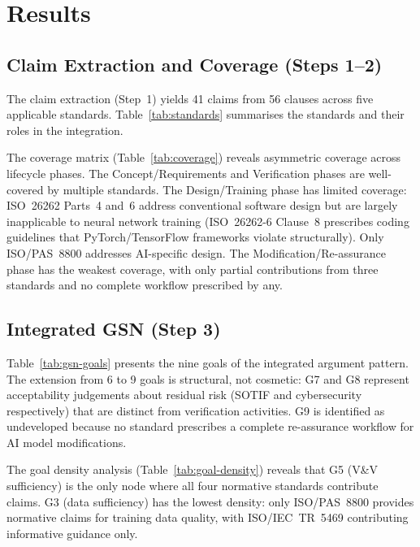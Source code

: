 
\section{Results}\label{sec:results}

\subsection{Claim Extraction and Coverage (Steps 1--2)}

The claim extraction (Step~1) yields 41 claims from 56 clauses across
five applicable standards. Table~\ref{tab:standards} summarises the
standards and their roles in the integration.

The coverage matrix (Table~\ref{tab:coverage}) reveals asymmetric
coverage across lifecycle phases. The Concept/Requirements and
Verification phases are well-covered by multiple standards.
The Design/Training phase has limited coverage: ISO~26262 Parts~4 and~6
address conventional software design but are largely inapplicable to
neural network training (ISO~26262-6 Clause~8 prescribes coding guidelines
that PyTorch/TensorFlow frameworks violate structurally). Only ISO/PAS~8800
addresses AI-specific design. The Modification/Re-assurance phase has
the weakest coverage, with only partial contributions from three standards
and no complete workflow prescribed by any.

\subsection{Integrated GSN (Step 3)}

Table~\ref{tab:gsn-goals} presents the nine goals of the integrated
argument pattern. The extension from 6 to 9 goals is structural, not
cosmetic: G7 and G8 represent acceptability judgements about residual
risk (SOTIF and cybersecurity respectively) that are distinct from
verification activities. G9 is identified as undeveloped because no
standard prescribes a complete re-assurance workflow for AI model
modifications.

The goal density analysis (Table~\ref{tab:goal-density}) reveals that
G5 (V\&V sufficiency) is the only node where all four normative
standards contribute claims. G3 (data sufficiency) has the lowest density:
only ISO/PAS~8800 provides normative claims for training data quality,
with ISO/IEC~TR~5469 contributing informative guidance only.

